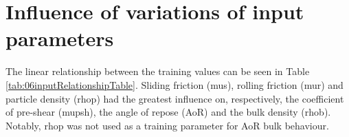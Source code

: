 
\chapter{Influence of variations of input parameters}
\label{cap:influence}




The linear relationship between the
training values can be seen in Table \ref{tab:06inputRelationshipTable}.
Sliding friction (\acs{mus}), rolling friction (\acs{mur}) and particle density (\acs{rhop})
had the greatest influence on, respectively, the coefficient of pre-shear
(\acs{mupsh}), the angle of repose  (\acs{AoR}) and the bulk density (\acs{rhob}). Notably, \acs{rhop}
was not used as a training parameter for \acs{AoR} bulk behaviour. 

